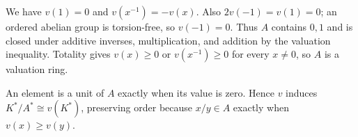 We have $v(1)=0$ and $v(x^{-1})=-v(x)$. Also $2v(-1)=v(1)=0$; an ordered abelian group is torsion-free, so $v(-1)=0$. Thus $A$ contains $0,1$ and is closed under additive inverses, multiplication, and addition by the valuation inequality. Totality gives $v(x)\geq0$ or $v(x^{-1})\geq0$ for every $x\neq0$, so $A$ is a valuation ring.

An element is a unit of $A$ exactly when its value is zero. Hence $v$ induces $K^*/A^*\cong v(K^*)$, preserving order because $x/y\in A$ exactly when $v(x)\geq v(y)$.
